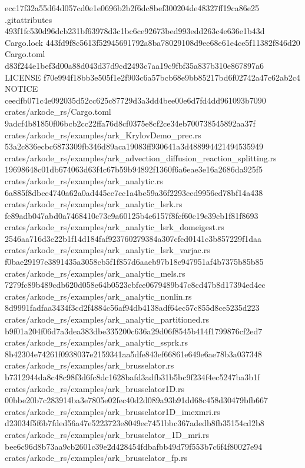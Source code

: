 \documentclass[
  10pt,
]{article}
\newenvironment{Shaded}{}{}
\newcommand{\NormalTok}[1]{#1}
\begin{document}
\begin{Shaded}
\begin{Highlighting}[]
\NormalTok{ecc17f32a55d64d057cd0e1e0696b2b2f6dc8bef300204de48327ff19ca86e25  .gitattributes}
\NormalTok{493f1fc530d96dcb231bf63978d3c1bc6ce92673bed993edd263c4e636e1b43d  Cargo.lock}
\NormalTok{443fd9f8c5613f52945691792a8ba78029108d9ee68e61e4ce5f11382f846d20  Cargo.toml}
\NormalTok{d83f244e1bef3d00a88d043d37d9cd2493c7aa19c9fbf35a837b310e867897a6  LICENSE}
\NormalTok{f70e994f18bb3e505f1e2f903c6a57bcb68e9bb85217bd6f02742a47c62ab2c4  NOTICE}
\NormalTok{ceedfb071c4e092035d52cc625c87729d3a3dd4bee00e6d7fd4dd961093b7090  crates/arkode\_rs/Cargo.toml}
\NormalTok{9adcf4b81850f06bcb2cc22ffa76d8cf0375e8cf2ce34eb700738545892aa37f  crates/arkode\_rs/examples/ark\_KrylovDemo\_prec.rs}
\NormalTok{53a2c836ecbc6873309fb346d89aca19083ff930641a3d488994421494535949  crates/arkode\_rs/examples/ark\_advection\_diffusion\_reaction\_splitting.rs}
\NormalTok{19698648c01db674063d63f4c67b59b94892f1360f6a6eae3e16a2686da925f5  crates/arkode\_rs/examples/ark\_analytic.rs}
\NormalTok{6a885f8dbce4740a62a0ad445ce7cc1a4be59a36f2293ced9956ed78bf14a438  crates/arkode\_rs/examples/ark\_analytic\_lsrk.rs}
\NormalTok{fe89adb047abd0a7468410c73c9a60125b4e6157f8fcf60c19e39cb1f81f8693  crates/arkode\_rs/examples/ark\_analytic\_lsrk\_domeigest.rs}
\NormalTok{2546aa716d3c22b1f14d184faf923760279384a307cfcd0141c3b857229f1daa  crates/arkode\_rs/examples/ark\_analytic\_lsrk\_varjac.rs}
\NormalTok{f0bae29197e3891435a3058cb5f1f857d6aaeb97b18e947951af4b7375b85b85  crates/arkode\_rs/examples/ark\_analytic\_mels.rs}
\NormalTok{7279fc89b489cdb620d058e64b0523cbfce0679489b47c8cd47b8d17394ed4ec  crates/arkode\_rs/examples/ark\_analytic\_nonlin.rs}
\NormalTok{8d9991fadfaa3434f3cd2f4884c56af94db4138adf64ec57c855d8ce5235d223  crates/arkode\_rs/examples/ark\_analytic\_partitioned.rs}
\NormalTok{b9f01a204f06d7a3dea383dbe335200c636a29d06f8545b414f1799876cf2ed7  crates/arkode\_rs/examples/ark\_analytic\_ssprk.rs}
\NormalTok{8b42304e74261f0938037e2159341aa5dfe843ef66861e649e6ae78b3a037348  crates/arkode\_rs/examples/ark\_brusselator.rs}
\NormalTok{b7312944da8c48c98f3d6fc8dc1628bafd3adfb31b5bc9f234f4ec5247ba3b1f  crates/arkode\_rs/examples/ark\_brusselator1D.rs}
\NormalTok{00bbe20b7c283914ba3e7805e02fec40d2d089a93b91dd68c458d30479bfb667  crates/arkode\_rs/examples/ark\_brusselator1D\_imexmri.rs}
\NormalTok{d23034f5f6b7fded56a47e5223723e8049ec7451bbc367adedb8fb35154cd2b8  crates/arkode\_rs/examples/ark\_brusselator\_1D\_mri.rs}
\NormalTok{bee6c96d8b73aa9cb2601c39e2d428454fdbafbb49d79f553b7c6f4f80027e94  crates/arkode\_rs/examples/ark\_brusselator\_fp.rs}

\end{Highlighting}
\end{Shaded}
\end{document}
